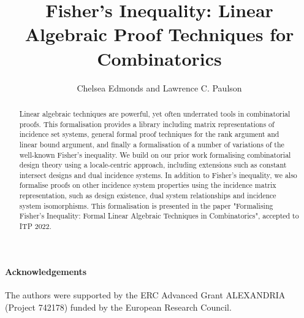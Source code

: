 \documentclass[11pt,a4paper]{article}
\begin{document}
\title{Fisher's Inequality: Linear Algebraic Proof Techniques for Combinatorics}
\author{Chelsea Edmonds and Lawrence C. Paulson}
\maketitle

\begin{abstract}
  Linear algebraic techniques are powerful, yet often underrated tools in combinatorial proofs. This formalisation provides a library including matrix representations of incidence set systems, general formal proof techniques for the rank argument and linear bound argument, and finally a formalisation of a number of variations of the well-known Fisher's inequality. We build on our prior work formalising combinatorial design theory using a locale-centric approach, including extensions such as constant intersect designs and dual incidence systems. In addition to Fisher's inequality, we also formalise proofs on other incidence system properties using the incidence matrix representation, such as design existence, dual system relationships and incidence system isomorphisms. This formalisation is presented in the paper "Formalising Fisher's Inequality: Formal Linear Algebraic Techniques in Combinatorics", accepted to ITP 2022.
\end{abstract}

\tableofcontents

\paragraph*{Acknowledgements}
The authors were supported by the ERC Advanced Grant ALEXANDRIA (Project 742178) funded by the European Research Council. 

\newpage





\end{document}
